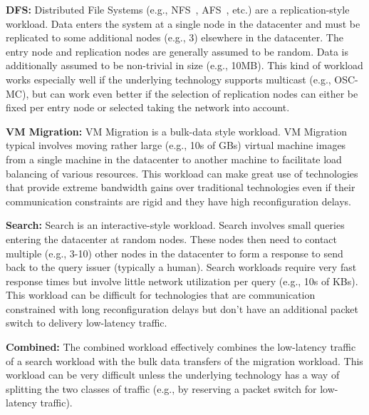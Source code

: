 {\bf DFS:} Distributed File Systems (e.g., NFS~\cite{NFS}, AFS~\cite{AFS}, etc.)
are a replication-style workload. Data enters the system at a single node in the
datacenter and must be replicated to some additional nodes (e.g., 3) elsewhere
in the datacenter. The entry node and replication nodes are generally assumed to
be random. Data is additionally assumed to be non-trivial in size (e.g.,
10MB). This kind of workload works especially well if the underlying technology
supports multicast (e.g., OSC-MC), but can work even better if the selection of
replication nodes can either be fixed per entry node or selected taking the
network into account.

{\bf VM Migration:} VM Migration is a bulk-data style workload. VM Migration
typical involves moving rather large (e.g., 10s of GBs) virtual machine images
from a single machine in the datacenter to another machine to facilitate load
balancing of various resources. This workload can make great use of technologies
that provide extreme bandwidth gains over traditional technologies even if their
communication constraints are rigid and they have high reconfiguration delays.

{\bf Search:} Search is an interactive-style workload. Search involves small
queries entering the datacenter at random nodes. These nodes then need to
contact multiple (e.g., 3-10) other nodes in the datacenter to form a response
to send back to the query issuer (typically a human). Search workloads require
very fast response times but involve little network utilization per query (e.g.,
10s of KBs). This workload can be difficult for technologies that are
communication constrained with long reconfiguration delays but don't have an
additional packet switch to delivery low-latency traffic.

{\bf Combined:} The combined workload effectively combines the low-latency
traffic of a search workload with the bulk data transfers of the migration
workload. This workload can be very difficult unless the underlying technology
has a way of splitting the two classes of traffic (e.g., by reserving a packet
switch for low-latency traffic).

